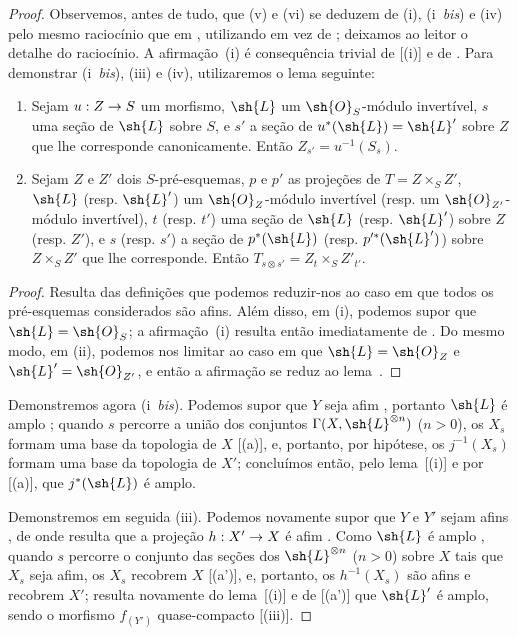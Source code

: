 \documentclass[oneside,10pt]{amsart}
\makeatletter
\newcommand{\ega@arrow}[2]{\mathchoice{#1}{#2}{#2}{#2}}
\renewcommand{\to}{\ega@arrow{\longrightarrow}{\rightarrow}}
\let\EGAOriginalLabel\label
\renewcommand{\label}[1]{\phantomsection\EGAOriginalLabel{#1}}
\makeatother
\begin{document}
\begin{proof}
Observemos, antes de tudo, que (v) e (vi) se deduzem de (i), (i~\emph{bis}) e (iv) pelo mesmo raciocínio que em , utilizando  em vez de ;
deixamos ao leitor o detalhe do raciocínio.
A afirmação~(i) é consequência trivial de [(i)] e de .
Para demonstrar (i~\emph{bis}), (iii) e (iv), utilizaremos o lema seguinte:
  \begin{lemma}[4.6.13.1]
  \label{II.4.6.13.1}
  \begin{enumerate}
    \item[\rm{(i)}] Sejam $u:Z\to S$ um morfismo, $\sh{L}$ um $\sh{O}_S$-módulo invertível, $s$ uma seção de $\sh{L}$ sobre $S$, e $s'$ a seção de $u^*(\sh{L})=\sh{L}'$ sobre $Z$ que lhe corresponde canonicamente.
      Então $Z_{s'}=u^{-1}(S_s)$.
    \item[\rm{(ii)}] Sejam $Z$ e $Z'$ dois $S$-pré-esquemas, $p$ e $p'$ as projeções de $T=Z\times_S Z'$, $\sh{L}$ (resp. $\sh{L}'$) um $\sh{O}_Z$-módulo invertível (resp. um $\sh{O}_{Z'}$-módulo invertível), $t$ (resp. $t'$) uma seção de $\sh{L}$ (resp. $\sh{L}'$) sobre $Z$ (resp. $Z'$), e $s$ (resp. $s'$) a seção de $p^*(\sh{L})$ (resp. $p'^*(\sh{L}')$) sobre $Z\times_S Z'$ que lhe corresponde.
      Então $T_{s\otimes s'}=Z_t\times_S Z'_{t'}$.
  \end{enumerate}
  \end{lemma}

  \begin{proof}
  Resulta das definições que podemos reduzir-nos ao caso em que todos os pré-esquemas considerados são afins.
  Além disso, em (i), podemos supor que $\sh{L}=\sh{O}_S$;
  a afirmação~(i) resulta então imediatamente de .
  Do mesmo modo, em (ii), podemos nos limitar ao caso em que $\sh{L}=\sh{O}_Z$ e $\sh{L}'=\sh{O}_{Z'}$, e então a afirmação se reduz ao lema~.
  \end{proof}

Demonstremos agora (i~\emph{bis}).
Podemos supor que $Y$ seja afim , portanto $\sh{L}$ é amplo ;
quando $s$ percorre a união dos conjuntos $\Gamma(X,\sh{L}^{\otimes n})$ ($n>0$), os $X_s$ formam uma base da topologia de $X$ [(a)], e, portanto, por hipótese, os $j^{-1}(X_s)$ formam uma base da topologia de $X'$;
concluímos então, pelo lema~[(i)] e por [(a)], que $j^*(\sh{L})$ é amplo.

Demonstremos em seguida (iii).
Podemos novamente supor que $Y$ e $Y'$ sejam afins , de onde resulta que a projeção $h:X'\to X$ é afim .
Como $\sh{L}$ é amplo , quando $s$ percorre o conjunto das seções dos $\sh{L}^{\otimes n}$ ($n>0$) sobre $X$ tais que $X_s$ seja afim, os $X_s$ recobrem $X$ [(a')], e, portanto, os $h^{-1}(X_s)$ são afins  e recobrem $X'$;
resulta novamente do lema~[(i)] e de [(a')] que $\sh{L}'$ é amplo, sendo o morfismo $f_{(Y')}$ quase-compacto [(iii)].


\end{proof}
\end{document}
